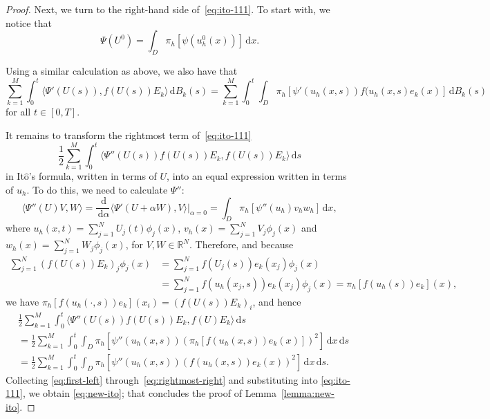 \documentclass[12pt]{article}
\newcommand{\dd}{\,\mathrm{d}}
\begin{document}
{\begin{proof}
Next, we turn to the right-hand side of~\eqref{eq:ito-111}. To start with, we notice that
%
\begin{equation}
\label{eq:first-right}
 \Psi(U^0) = \int_D \pi_h[\psi(u_h^0(x))]\dd x.
 \end{equation}
%

Using a similar calculation as above, we also have that
%
\begin{equation}
\label{eq:second-right}
\sum_{k=1}^M \int_0^t \langle \Psi'(U(s)), f(U(s))E_k\rangle \dd B_k(s) = \sum_{k=1}^M \int_0^t \int_D \pi_h [\psi'(u_h(x,s))f(u_h(x,s)e_k(x)] \dd B_k(s)
 \end{equation}
%
for all $t \in [0,T]$.

It remains to transform the rightmost term of~\eqref{eq:ito-111}
%
\[ \frac{1}{2}\sum_{k=1}^M \int_0^t \langle \Psi''(U(s))f(U(s))E_k, f(U(s))E_k \rangle \dd s\]
%
in It$\hat{\mathrm{o}}$'s formula, written in terms of $U$, into an equal expression written in terms of $u_h$. To do this, we need to calculate $\Psi''$:
%
\[ \langle \Psi''(U)V, W \rangle = \frac{\dd}{\dd \alpha} \langle \Psi'(U + \alpha W) , V \rangle|_{\alpha = 0} = \int_D \pi_h[\psi''(u_h)v_h w_h]\dd x,\] 
%
where $u_h(x,t) = \sum_{j=1}^N U_j(t) \phi_j(x)$, $v_h(x) = \sum_{j=1}^N V_j \phi_j(x)$ and $w_h(x) = \sum_{j=1}^N W_j \phi_j(x)$, for $V, W \in \mathbb{R}^N$. Therefore,
and because 
%
\begin{align*} 
\sum_{j=1}^N (f(U(s))E_k)_j \phi_j(x) &= \sum_{j=1}^N f(U_j(s))e_k(x_j) \phi_j(x) \\
&= \sum_{j=1}^N f(u_h(x_j,s))e_k(x_j) \phi_j(x)= \pi_h[f(u_h(s))e_k](x),
\end{align*}
%
we have $\pi_h[f(u_h(\cdot,s))e_k](x_i) = (f(U(s))E_k)_i$, and hence
%
\begin{align}\label{eq:rightmost-right}
&\frac{1}{2}\sum_{k=1}^M \int_0^t \langle \Psi''(U(s))f(U{(s)})E_k, f(U)E_k \rangle \dd s \nonumber\\\nonumber
&= 
\frac{1}{2}\sum_{k=1}^M \int_0^t \int_D\! \pi_h[\psi''(u_h(x,s))(\pi_h[f(u_h(x,s))e_k(x)])^2] \dd x \dd s \\
&= 
\frac{1}{2}\sum_{k=1}^M \int_0^t \int_D \pi_h[\psi''(u_h(x,s))(f(u_h(x,s))e_k(x))^2]\dd x \dd s.
\end{align}
%
Collecting \eqref{eq:first-left} through~\eqref{eq:rightmost-right} and substituting into \eqref{eq:ito-111}, we obtain \eqref{eq:new-ito}; that concludes the proof of Lemma~\ref{lemma:new-ito}.
\end{proof}



}
\end{document}
